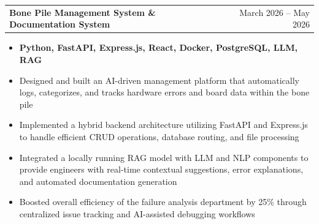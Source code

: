 \documentclass[letterpaper,11pt]{article}
\makeatletter
\newcommand{\resumeItem}[1]{
  \item\small{
    {#1 \vspace{-2pt}}
  }
}
\newcommand{\resumeProjectHeading}[2]{
    \item
    \begin{tabular*}{0.97\textwidth}{l@{\extracolsep{\fill}}r}
      \small#1 & #2 \\
    \end{tabular*}\vspace{-8pt}
}
\newcommand{\resumeItemListStart}{\begin{itemize}}
\newcommand{\resumeItemListEnd}{\end{itemize}\vspace{-6pt}}
\makeatother
\begin{document}
\resumeProjectHeading
{\textbf{Bone Pile Management System \& Documentation System}}{March 2026 -- May 2026}
\resumeItemListStart
\resumeItem{ \textbf{Python, FastAPI, Express.js, React, Docker, PostgreSQL, LLM, RAG}}
\resumeItem{Designed and built an AI-driven management platform that automatically logs, categorizes, and tracks hardware errors and board data within the bone pile}
\resumeItem{Implemented a hybrid backend architecture utilizing FastAPI and Express.js to handle efficient CRUD operations, database routing, and file processing}
\resumeItem{Integrated a locally running RAG model with LLM and NLP components to provide engineers with real-time contextual suggestions, error explanations, and automated documentation generation}
\resumeItem{Boosted overall efficiency of the failure analysis department by 25\% through centralized issue tracking and AI-assisted debugging workflows}
\resumeItemListEnd \vspace{-5pt}


\end{document}
